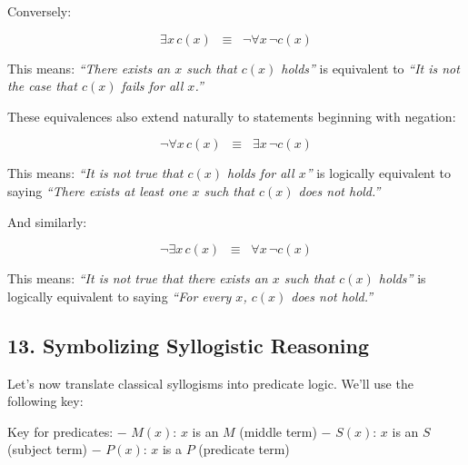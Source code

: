 Conversely:

\[
\exists x \, c(x) \;\;\equiv\;\; \lnot \forall x \, \lnot c(x)
\]

This means: \emph{``There exists an \(x\) such that \(c(x)\) holds''} is
equivalent to \emph{``It is not the case that \(c(x)\) fails for all
\(x\).''}

These equivalences also extend naturally to statements beginning with
negation:

\[
\lnot \forall x \, c(x) \;\;\equiv\;\; \exists x \, \lnot c(x)
\]

This means: \emph{``It is not true that \(c(x)\) holds for all \(x\)''}
is logically equivalent to saying \emph{``There exists at least one
\(x\) such that \(c(x)\) does not hold.''}

And similarly:

\[
\lnot \exists x \, c(x) \;\;\equiv\;\; \forall x \, \lnot c(x)
\]

This means: \emph{``It is not true that there exists an \(x\) such that
\(c(x)\) holds''} is logically equivalent to saying \emph{``For every
\(x\), \(c(x)\) does not hold.''}

\subsection{13. Symbolizing Syllogistic
Reasoning}\label{symbolizing-syllogistic-reasoning}

Let's now translate classical syllogisms into predicate logic. We'll use
the following key:

Key for predicates: − \(M(x)\): \(x\) is an \(M\) (middle term) −
\(S(x)\): \(x\) is an \(S\) (subject term) − \(P(x)\): \(x\) is a \(P\)
(predicate term)

